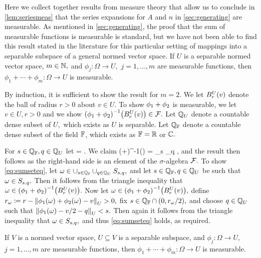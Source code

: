 Here we collect together results from measure theory that allow us to conclude in \cref{lem:seriesmeas} that the series expansions for $A$ and $n$ in \cref{sec:generating} are measurable. As mentioned in \cref{sec:generating}, the proof that the sum of measurable functions is measurable is standard, but we have not been able to find this result stated in the literature for this particular setting of mappings into a separable subspace of a general normed vector space.
\ble\label{lem:sepsum}
If $U$ is a separable normed vector space, $m \in \mathbb N,$ and $\phi_j:\Omega\rightarrow U,$ $j=1,\ldots,m$  are measurable functions, then $\phi_1+\cdots+\phi_m : \Omega\rightarrow U$ is measurable.
\ele

By induction, it is sufficient to show the result for $m=2.$ We let $\Ballspace{U}{r}{v}$ denote the ball of radius $r>0$ about $v \in U$. To show $\phi_{1}+\phi_{2}$ is measurable, we let $v \in U, r>0$ and we show $\mleft(\phio+\phit\mright)^{-1}\mleft(\Ballspace{U}{r}{v}\mright) \in \cF.$ Let $\mathbb Q_{U}$ denote a countable dense subset of $U,$ which exists as $U$ is separable. Let $\mathbb Q_{\mathbb F}$ denote a countable dense subset of the field $\mathbb F$, which exists as $\mathbb F = \mathbb R$ or $\mathbb C.$

For $s \in \mathbb Q_{\mathbb F}, q \in \mathbb Q_{U}$ let
\beqs
\setsq =  \cap {}.
\eeqs
We claim
\beq\label{eq:sumseteq}
\mleft(\phio+\phit\mright)^{-1}\mleft(\mright) = \bigcup_{s \in \QQFF} \bigcup_{q \in \QQU} \setsq,
\eeq
and the result then follows as the right-hand side is an element of the $\sigma$-algebra $\mathcal F.$ To show \eqref{eq:sumseteq}, let $\omega \in \cup_{s \in \mathbb Q_{\mathbb F}}\cup_{q \in \mathbb Q_{U}} S_{s,q},$ and let $s \in \mathbb Q_{\mathbb F}, q \in \mathbb Q_{U}$ be such that $\omega \in S_{s,q}.$ Then it follows from the triangle inequality that $\omega \in \mleft(\phio+\phit\mright)^{-1}\mleft(\Ballspace{U}{r}{v}\mright).$
Now let $\omega \in \mleft(\phio+\phit\mright)^{-1}\mleft(\Ballspace{U}{r}{v}\mright),$ define $\dw \de r - \NU{\phio(\omega)+\phit(\omega)-v} > 0,$ fix $s \in \mathbb Q_{\mathbb F} \cap (0,r_{\omega}/2),$ and choose $q \in \mathbb Q_{U}$ such that $\NU{\phio(\omega) - v/2 -q} < s.$ Then again it follows from the triangle inequality that $\omega \in S_{s,q},$ and thus \eqref{eq:sumseteq} holds, as required.
\epf

\bco\label{cor:sepsubsum}
If $V$ is a normed vector space, $U \subseteq V$ is a separable subspace, and $\phi_j:\Omega\rightarrow U,$  $j=1,\ldots,m$  are measurable functions, then $\phi_1+\cdots+\phi_m : \Omega\rightarrow U$ is measurable.
\eco

